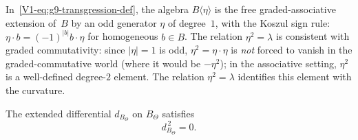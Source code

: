\begin{remark}
In~\eqref{V1-eq:g9-transgression-def}, the algebra $B\langle \eta \rangle$
is the free graded-associative extension of~$B$ by an odd generator
$\eta$ of degree~$1$, with the Koszul sign rule: $\eta \cdot b =
(-1)^{|b|} b \cdot \eta$ for homogeneous $b \in B$. The relation
$\eta^2 = \lambda$ is consistent with graded commutativity: since
$|\eta| = 1$ is odd, $\eta^2 = \eta \cdot \eta$ is
\emph{not} forced to vanish in the graded-commutative world (where it
would be $-\eta^2$); in the associative setting, $\eta^2$ is a
well-defined degree-$2$ element. The relation $\eta^2 = \lambda$
identifies this element with the curvature.
\end{remark}

\begin{proposition}
The extended differential $d_{B_\Theta}$ on $B_\Theta$ satisfies
\begin{equation}%
d_{B_\Theta}^{\,2} = 0.
\end{equation}
\end{proposition}

